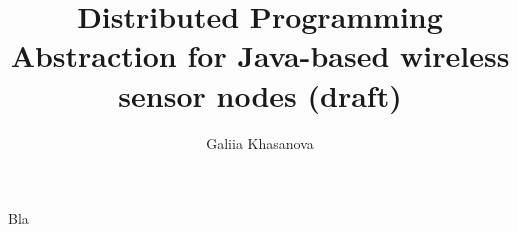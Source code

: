 \documentclass[msc, openright, a4paper]{TNthesis}
\title{Distributed Programming Abstraction for Java-based wireless sensor nodes
(draft)}
\author{Galiia Khasanova}
\begin{document}
 

\begin{preliminary}
\maketitle 
\begin{acknowledgements}
Bla
\end{acknowledgements}
\standarddeclaration
\tableofcontents
\listoffigures
\listoftables
\end{preliminary}  







\end{document}
